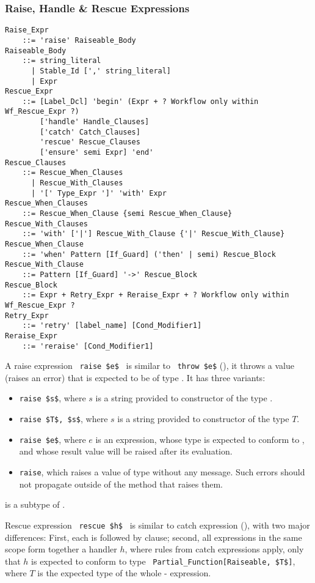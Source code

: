 \subsubsection{Raise, Handle \& Rescue Expressions}

\grammar\begin{lstlisting}
Raise_Expr
    ::= 'raise' Raiseable_Body
Raiseable_Body 
    ::= string_literal
      | Stable_Id [',' string_literal]
      | Expr
Rescue_Expr
    ::= [Label_Dcl] 'begin' (Expr + ? Workflow only within Wf_Rescue_Expr ?)
        ['handle' Handle_Clauses]
        ['catch' Catch_Clauses]
        'rescue' Rescue_Clauses
        ['ensure' semi Expr] 'end'
Rescue_Clauses 
    ::= Rescue_When_Clauses
      | Rescue_With_Clauses
      | '[' Type_Expr ']' 'with' Expr
Rescue_When_Clauses
    ::= Rescue_When_Clause {semi Rescue_When_Clause}
Rescue_With_Clauses
    ::= 'with' ['|'] Rescue_With_Clause {'|' Rescue_With_Clause}
Rescue_When_Clause 
    ::= 'when' Pattern [If_Guard] ('then' | semi) Rescue_Block
Rescue_With_Clause 
    ::= Pattern [If_Guard] '->' Rescue_Block
Rescue_Block
    ::= Expr + Retry_Expr + Reraise_Expr + ? Workflow only within Wf_Rescue_Expr ?
Retry_Expr
    ::= 'retry' [label_name] [Cond_Modifier1]
Reraise_Expr
    ::= 'reraise' [Cond_Modifier1]
\end{lstlisting}

A raise expression ~\lstinline!raise $e$!~ is similar to ~\lstinline!throw $e$! (), it throws a value (raises an error) that is expected to be of type . It has three variants: 
\begin{itemize}
  \item[] \lstinline!raise $s$!, where $s$ is a string provided to constructor of the type . 
  \item[] \lstinline!raise $T$, $s$!, where $s$ is a string provided to constructor of the type $T$. 
  \item[] \lstinline!raise $e$!, where $e$ is an expression, whose type is expected to conform to , and whose result value will be raised after its evaluation. 
  \item[] \lstinline!raise!, which raises a value of type  without any message. Such errors should not propagate outside of the method that raises them. 
\end{itemize}

 is a subtype of . 

Rescue expression ~\lstinline!rescue $h$!~ is similar to catch expression (), with two major differences: First, each  is followed by  clause; second, all  expressions in the same scope form together a handler $h$, where rules from catch expressions apply, only that $h$ is expected to conform to type ~\lstinline!Partial_Function[Raiseable, $T$]!, where $T$ is the expected type of the whole - expression. 

